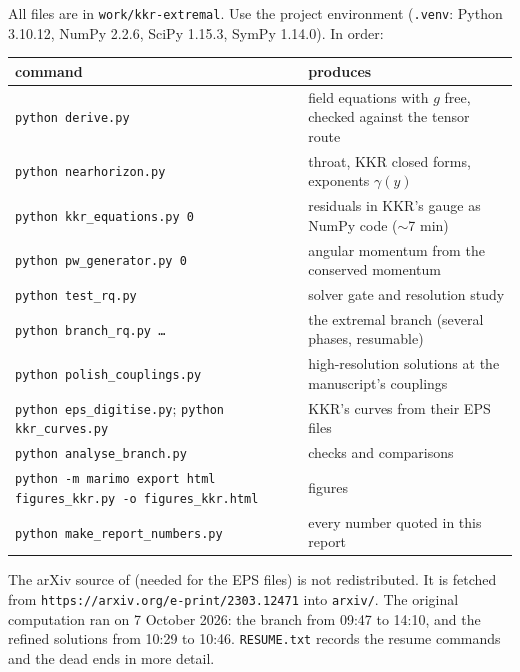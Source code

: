 \documentclass[11pt,a4paper]{article}
\begin{document}
All files are in \texttt{work/kkr-extremal}. Use the project environment
(\texttt{.venv}: Python 3.10.12, NumPy 2.2.6, SciPy 1.15.3, SymPy 1.14.0). In
order:
\begin{center}\small
\begin{tabular}{@{}p{}p{}@{}}
\toprule
command & produces \\
\midrule
\texttt{python derive.py} & field equations with $g$ free, checked against the tensor route \\
\texttt{python nearhorizon.py} & throat, KKR closed forms, exponents $\gamma(y)$ \\
\texttt{python kkr\_equations.py 0} & residuals in KKR's gauge as NumPy code ($\sim$7 min) \\
\texttt{python pw\_generator.py 0} & angular momentum from the conserved momentum \\
\texttt{python test\_rq.py} & solver gate and resolution study \\
\texttt{python branch\_rq.py \dots} & the extremal branch (several phases, resumable) \\
\texttt{python polish\_couplings.py} & high-resolution solutions at the manuscript's couplings \\
\texttt{python eps\_digitise.py}; \texttt{python kkr\_curves.py} & KKR's curves from their EPS files \\
\texttt{python analyse\_branch.py} & checks and comparisons \\
\texttt{python -m marimo export html figures\_kkr.py -o figures\_kkr.html} & figures \\
\texttt{python make\_report\_numbers.py} & every number quoted in this report \\
\bottomrule
\end{tabular}
\end{center}
The arXiv source of \cite{KKR2023} (needed for the EPS files) is not
redistributed. It is fetched from \texttt{https://arxiv.org/e-print/2303.12471}
into \texttt{arxiv/}. The original computation ran on 7 October 2026: the branch
from 09:47 to 14:10, and the refined solutions from 10:29 to 10:46.
\texttt{RESUME.txt} records the resume commands and the dead ends in more detail.
\end{document}
